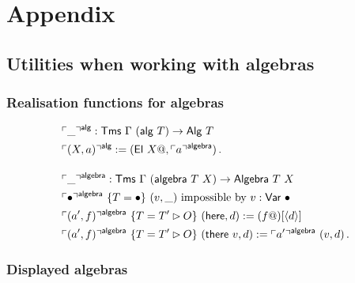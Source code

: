 \section{Appendix}

\subsection{Utilities when working with algebras} \label{app:algebras}

\subsubsection{Realisation functions for algebras}

\begin{align*}
&\emb{\_}^{\mta{alg}} : \Tms\ \Gamma\ (\mta{alg}\ T) \to \mta{Alg}\ T \\
&\emb{(X, a)}^{\mta{alg}} := (\mta{El}\ X@, \emb{a}^{\mta{algebra}}) \,. \\[1em]
&\emb{\_}^{\mta{algebra}} : \Tms\ \Gamma\ (\mta{algebra}\ T\ X) \to \mta{Algebra}\ T\ X \\
&\emb{\bullet}^{\mta{algebra}}\ \{T = \bullet\}\ (v, \_)\text{ impossible by $v : \mta{Var}\ \bullet$} \\
&\emb{(a', f)}^{\mta{algebra}}\ \{T = T' \rhd O\}\ (\mta{here}, d) := (f@)[\Msub{d}] \\
&\emb{(a', f)}^{\mta{algebra}}\ \{T = T' \rhd O\}\ (\mta{there}\ v, d) := \emb{a'}^{\mta{algebra}}\ (v, d) \,.
\end{align*}

\subsubsection{Displayed algebras}

